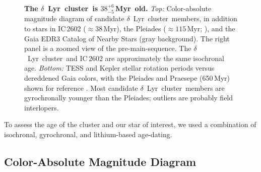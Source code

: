 \documentclass[12pt,modern,twocolumn,tighten]{aastex63}
\newcommand{\cn}{$\delta$\ Lyr\ cluster} %
\newcommand{\clusterage}{$38^{+6}_{-5}$\,Myr} %
\begin{document}
\begin{figure}[tp]
\begin{center}
		\vspace{-0.5cm}
	\end{center}
	\vspace{-0.7cm}
	\caption{
    {\bf The \cn\ is \clusterage\ old.}  {\it Top:}
    Color-absolute magnitude diagram of candidate \cn\ members, in addition to
    stars in IC\,2602 ($\approx38$\,Myr), the Pleiades ($\approx
    115$\,Myr; \citealt{dahm_2015}), and the Gaia EDR3 Catalog of
    Nearby Stars (gray background).  The right panel is a
    zoomed view of the pre-main-sequence.  The \cn\ and IC\,2602 are
    approximately the same isochronal age.  {\it Bottom:} TESS and
    Kepler stellar rotation periods versus dereddened Gaia colors,
    with the Pleiades and Praesepe (650\,Myr) shown for reference
    \citep{rebull_rotation_2016a,douglas_poking_2017}.  Most
    candidate \cn\ members are gyrochronally younger than the
    Pleiades; outliers are probably field interlopers.
   \label{fig:age}
	}
\end{figure}

To assess the age of the cluster and our star of interest, we used a
combination of isochronal, gyrochronal, and lithium-based
age-dating.

\subsection{Color-Absolute Magnitude Diagram}
\label{sec:camd}
\end{document}
